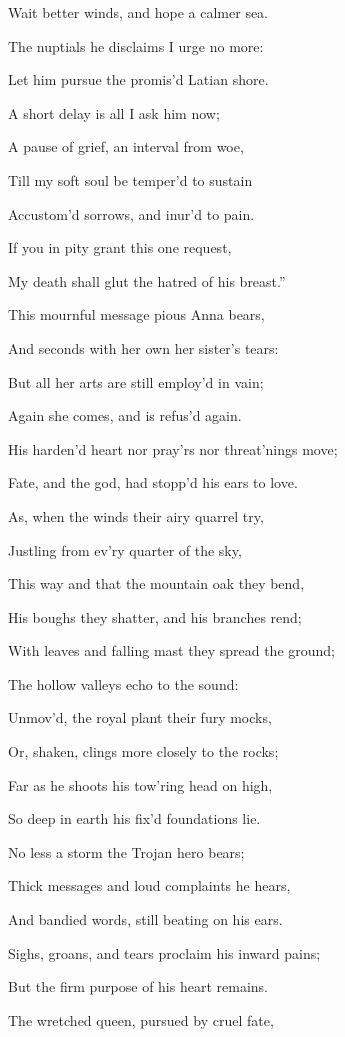 Wait better winds, and hope a calmer sea.

The nuptials he disclaims I urge no more:

Let him pursue the promis’d Latian shore.

A short delay is all I ask him now;

A pause of grief, an interval from woe,

Till my soft soul be temper’d to sustain

Accustom’d sorrows, and inur’d to pain.

If you in pity grant this one request,

My death shall glut the hatred of his breast.”

This mournful message pious Anna bears,

And seconds with her own her sister’s tears:

But all her arts are still employ’d in vain;

Again she comes, and is refus’d again.

His harden’d heart nor pray’rs nor threat’nings move;

Fate, and the god, had stopp’d his ears to love.

As, when the winds their airy quarrel try,

Justling from ev’ry quarter of the sky,

This way and that the mountain oak they bend,

His boughs they shatter, and his branches rend;

With leaves and falling mast they spread the ground;

The hollow valleys echo to the sound:

Unmov’d, the royal plant their fury mocks,

Or, shaken, clings more closely to the rocks;

Far as he shoots his tow’ring head on high,

So deep in earth his fix’d foundations lie.

No less a storm the Trojan hero bears;

Thick messages and loud complaints he hears,

And bandied words, still beating on his ears.

Sighs, groans, and tears proclaim his inward pains;

But the firm purpose of his heart remains.

The wretched queen, pursued by cruel fate,

